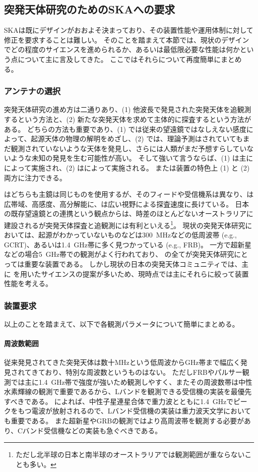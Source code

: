 \subsection{突発天体研究のためのSKAへの要求} \label{transients.s3.requirements}

SKAは既にデザインがおおよそ決まっており、その装置性能や運用体制に対して修正を要求することは難しい。
そのことを踏まえて本節では、現状のデザインでどの程度のサイエンスを進められるか、あるいは最低限必要な性能は何かという点について主に言及してきた。
ここではそれらについて再度簡単にまとめる。

\subsubsection{アンテナの選択}
突発天体研究の進め方は二通りあり、(1) 他波長で発見された突発天体を追観測するという方法と、(2) 新たな突発天体を求めて主体的に探査するという方法がある。
どちらの方法も重要であり、(1) では従来の望遠鏡ではなしえない感度によって、起源天体の物理の解明をめざし、(2) では、理論予測はされていてもまだ観測されていないような天体を発見し、さらには人類がまだ予想すらしていないような未知の発見を生む可能性が高い。
そして強いて言うならば、(1) は主に\skamid{}によって実施され、(2) は\skasur{}によって実施される。
また\skalow{}は装置の特色上 (1) と (2) 両方に注力できる。

\skamidsur{} はどちらも主鏡は同じものを使用するが、そのフィードや受信機系は異なり、\skamid{}は広帯域、高感度、高分解能に、\skasur{}は広い視野による探査速度に長けている。
日本の既存望遠鏡との連携という観点からは、時差のほとんどないオーストラリアに建設される\skasur{}が突発天体探査と追観測には有利といえる\footnote{ただし北半球の日本と南半球のオーストラリアでは観測範囲が重ならないことも多い。}。
現状の突発天体研究においては、起源がわかっていないものなどは300~MHzなどの低周波帯 (e.g., GCRT)、あるいは1.4~GHz帯に多く見つかっている (e.g., FRB)。
一方で超新星などの場合5~GHz帯での観測がよく行われており、\skalowmidsur{} の全てが突発天体研究にとっては重要な装置である。
しかし現状の日本の突発天体コミュニティでは、主に\skamidsur{} を用いたサイエンスの提案が多いため、現時点では主にそれらに絞って装置性能を考える。

\subsubsection{装置要求}
以上のことを踏まえて、以下で各観測パラメータについて簡単にまとめる。

\paragraph{周波数範囲}
従来発見されてきた突発天体は数十MHzという低周波からGHz帯まで幅広く発見されてきており、特別な周波数というものはない。
ただしFRBやパルサー観測では主に1.4~GHz帯で強度が強いため観測しやすく、またその周波数帯は中性水素輝線の観測で重要であるから、Lバンドを観測できる受信機の実装を最優先すべきである。
\citet{2011Natur.478...82N}によれば、中性子星連星合体で重力波とともに1.4~GHzでピークをもつ電波が放射されるので、Lバンド受信機の実装は重力波天文学においても重要である。
また超新星やGRBの観測ではより高周波帯を観測する必要があり、Cバンド受信機などの実装も急ぐべきである。

